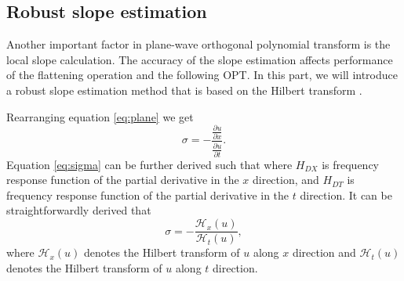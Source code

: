 \subsection{Robust slope estimation}
Another important factor in plane-wave orthogonal polynomial transform is the local slope calculation. The accuracy of the slope estimation affects performance of the flattening operation and the following OPT.   In this part, we will introduce a robust slope estimation method that is based on the Hilbert transform \cite[]{liuyang2015}. 

Rearranging equation \ref{eq:plane} we get 
\begin{equation}
\label{eq:sigma}
\sigma = -\frac{\frac{\partial u}{\partial x}}{\frac{\partial u}{\partial t}}. 
\end{equation}
Equation \ref{eq:sigma} can be further derived such that  
where $H_{DX}$ is frequency response function of the partial derivative in the $x$ direction, and $H_{DT}$ is frequency response function of the partial derivative in the $t$ direction.  It can be straightforwardly derived that 
\begin{equation}
\label{eq:sigma2}
\sigma =-\frac{\mathcal{H}_x(u)}{\mathcal{H}_t(u)},
\end{equation}
where $\mathcal{H}_x(u)$ denotes the Hilbert transform of $u$ along $x$ direction and $\mathcal{H}_t(u)$ denotes the Hilbert transform of $u$ along $t$ direction. %

